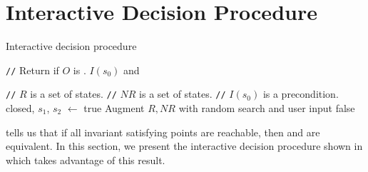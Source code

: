 \section{Interactive Decision Procedure}
\newcommand{\Helper}{\textsc{Helper}}
\newcommand{\IsIclosed}{\textsc{IsIclosed}}
\newcommand{\IsInvConfluent}{\textsc{IsInvConfluent}}

\newcommand{\algocomment}[1]{\State \textcolor{flatdenim}{\texttt{//} #1}}
\begin{algorithm}[t]
  \caption{Interactive \invariantconfluence{} decision procedure}%
  \begin{algorithmic}
    \algocomment{Return if $O$ is \sTIconfluent{}.}
      \State
        \Return $I(s_0)$ and
    \EndFunction

    \State

    \algocomment{$R$ is a set of \sTIreachable{} states.}
    \algocomment{$NR$ is a set of \sTIunreachable{} states.}
    \algocomment{$I(s_0)$ is a precondition.}
      \State closed, $s_1$, $s_2$ $\gets$ 
        \Return true
      \EndIf
      \State Augment $R, NR$ with random search and user input
        \Return false
      \EndIf
      \State \Return {}
    \EndFunction
  \end{algorithmic}
\end{algorithm}

 tells us that if all invariant
satisfying points are reachable, then \invariantclosure{} and
\invariantconfluence{} are equivalent. In this section, we present the
interactive \invariantconfluence{} decision procedure shown in
 which takes advantage of this result.

